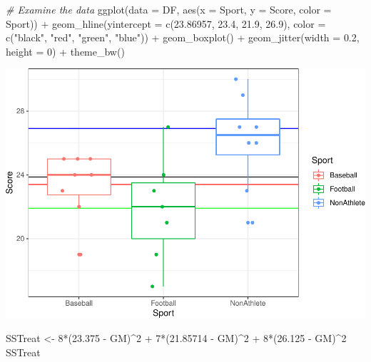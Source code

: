 \documentclass[
]{article}
\newenvironment{Shaded}{\begin{snugshade}}{\end{snugshade}}
\newcommand{\AttributeTok}[1]{\textcolor[rgb]{0.77,0.63,0.00}{#1}}
\newcommand{\CommentTok}[1]{\textcolor[rgb]{0.56,0.35,0.01}{\textit{#1}}}
\newcommand{\DecValTok}[1]{\textcolor[rgb]{0.00,0.00,0.81}{#1}}
\newcommand{\FloatTok}[1]{\textcolor[rgb]{0.00,0.00,0.81}{#1}}
\newcommand{\FunctionTok}[1]{\textcolor[rgb]{0.00,0.00,0.00}{#1}}
\newcommand{\NormalTok}[1]{#1}
\newcommand{\OtherTok}[1]{\textcolor[rgb]{0.56,0.35,0.01}{#1}}
\newcommand{\SpecialCharTok}[1]{\textcolor[rgb]{0.00,0.00,0.00}{#1}}
\newcommand{\StringTok}[1]{\textcolor[rgb]{0.31,0.60,0.02}{#1}}
\begin{document}
\begin{Shaded}
\begin{Highlighting}[]
\CommentTok{\# Examine the data}
\FunctionTok{ggplot}\NormalTok{(}\AttributeTok{data =}\NormalTok{ DF, }\FunctionTok{aes}\NormalTok{(}\AttributeTok{x =}\NormalTok{ Sport, }\AttributeTok{y =}\NormalTok{ Score, }\AttributeTok{color =}\NormalTok{ Sport)) }\SpecialCharTok{+}
  \FunctionTok{geom\_hline}\NormalTok{(}\AttributeTok{yintercept =} \FunctionTok{c}\NormalTok{(}\FloatTok{23.86957}\NormalTok{, }\FloatTok{23.4}\NormalTok{, }\FloatTok{21.9}\NormalTok{, }\FloatTok{26.9}\NormalTok{), }
             \AttributeTok{color =} \FunctionTok{c}\NormalTok{(}\StringTok{"black"}\NormalTok{, }\StringTok{"red"}\NormalTok{, }\StringTok{"green"}\NormalTok{, }\StringTok{"blue"}\NormalTok{)) }\SpecialCharTok{+}
  \FunctionTok{geom\_boxplot}\NormalTok{() }\SpecialCharTok{+} 
  \FunctionTok{geom\_jitter}\NormalTok{(}\AttributeTok{width =} \FloatTok{0.2}\NormalTok{, }\AttributeTok{height =} \DecValTok{0}\NormalTok{) }\SpecialCharTok{+} 
  \FunctionTok{theme\_bw}\NormalTok{()}
\end{Highlighting}
\end{Shaded}

\begin{center}\includegraphics{SDM-CHAP25_files/figure-latex/unnamed-chunk-1-1} \end{center}

\begin{Shaded}
\begin{Highlighting}[]
\NormalTok{SSTreat }\OtherTok{\textless{}{-}} \DecValTok{8}\SpecialCharTok{*}\NormalTok{(}\FloatTok{23.375} \SpecialCharTok{{-}}\NormalTok{ GM)}\SpecialCharTok{\^{}}\DecValTok{2} \SpecialCharTok{+} \DecValTok{7}\SpecialCharTok{*}\NormalTok{(}\FloatTok{21.85714} \SpecialCharTok{{-}}\NormalTok{ GM)}\SpecialCharTok{\^{}}\DecValTok{2} \SpecialCharTok{+} \DecValTok{8}\SpecialCharTok{*}\NormalTok{(}\FloatTok{26.125} \SpecialCharTok{{-}}\NormalTok{ GM)}\SpecialCharTok{\^{}}\DecValTok{2}
\NormalTok{SSTreat}
\end{Highlighting}
\end{Shaded}
\end{document}
